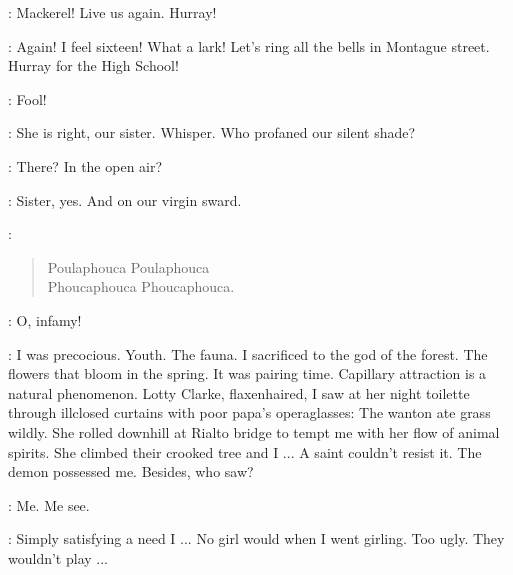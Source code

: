 
\HalcyonDays:
Mackerel!
Live us again.
Hurray!

\Bloom:
Again!
I feel sixteen!
What a lark!
Let's ring all the bells in Montague street.
Hurray for the High School!

\Echo:
Fool!

\Yews:
She is right, our sister.
Whisper.
Who profaned our silent shade?

\Nymph:
There?
In the open air?

\Yews:
Sister, yes.
And on our virgin sward.

\Waterfall:
\begin{verse}
    Poulaphouca Poulaphouca\\
    Phoucaphouca Phoucaphouca.
\end{verse}

\Nymph:
O, infamy!

\Bloom:
I was precocious.
Youth.
The fauna.
I sacrificed to the god of the forest.
The flowers that bloom in the spring.
It was pairing time.
Capillary attraction is a natural phenomenon.
Lotty Clarke, flaxenhaired,
I saw at her night toilette through illclosed curtains
with poor papa's operaglasses:
The wanton ate grass wildly.
She rolled downhill at Rialto bridge
to tempt me with her flow of animal spirits.
She climbed their crooked tree and I ...
A saint couldn't resist it.
The demon possessed me.
Besides, who saw?


\StaggeringBob:
Me. Me see.

\Bloom:
Simply satisfying a need I ...
No girl would when I went girling.
Too ugly.
They wouldn't play ...

